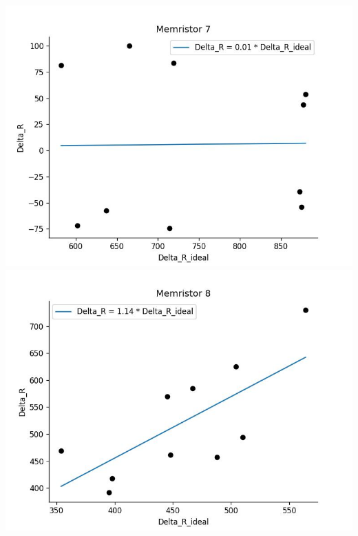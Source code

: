     \includegraphics[width=\textwidth / 2]{code/plots/model_1_memristor_7}
    \includegraphics[width=\textwidth / 2]{code/plots/model_1_memristor_8}

